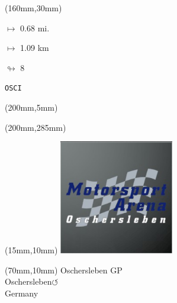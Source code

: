 \begin{textblock*}{40mm}(160mm,30mm)%
\Large
\par$\mapsto$ 0.68 mi.
\par$\mapsto$ 1.09 km
\par$\looparrowright$ 8
\par\hfill\tiny\tt OSCI\\
\end{textblock*}
\begin{textblock*}{20mm}(200mm,5mm)%
\fbox{\thepage}
\label{OSCI}
\end{textblock*}
\begin{textblock*}{20mm}(200mm,285mm)%
\fbox{\thepage}
\end{textblock*}

\null\newpage
\begin{textblock*}{50mm}(15mm,10mm)%
\includegraphics[width=50mm]{LG/2015-05-20_00090.png}
\end{textblock*}
\begin{textblock*}{130mm}(70mm,10mm)%
{\fontsize{20}{20}\selectfont Oschersleben GP\\}
{\fontsize{16}{16}\selectfont Oschersleben\hfill \huge$\circlearrowleft$\\}
{\fontsize{12}{12}\selectfont Germany\\}
\end{textblock*}
